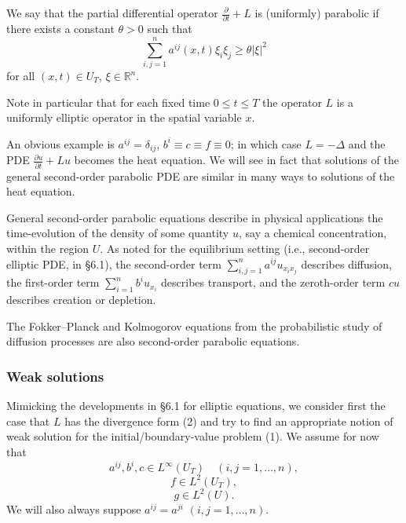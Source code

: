 \begin{definition}
\label{def:uniform-parabolicity}
We say that the partial differential operator $\frac{\partial}{\partial t} + L$ is (uniformly) parabolic if there exists a constant $\theta > 0$ such that
\[
\sum_{i,j=1}^{n} a^{ij}(x,t)\xi_i \xi_j \geq \theta|\xi|^2
\tag{4}
\]
for all $(x,t) \in U_T$, $\xi \in \mathbb{R}^n$.
\end{definition}

\begin{remark}
\label{rem:parabolic-operator-elliptic-fixed-time}
Note in particular that for each fixed time $0 \leq t \leq T$ the operator $L$ is a uniformly elliptic operator in the spatial variable $x$.
\end{remark}

An obvious example is $a^{ij} = \delta_{ij}$, $b^i \equiv c \equiv f \equiv 0$; in which case $L = -\Delta$ and the PDE $\frac{\partial u}{\partial t} + Lu$ becomes the heat equation. We will see in fact that solutions of the general second-order parabolic PDE are similar in many ways to solutions of the heat equation.

General second-order parabolic equations describe in physical applications the time-evolution of the density of some quantity $u$, say a chemical concentration, within the region $U$. As noted for the equilibrium setting (i.e., second-order elliptic PDE, in \S6.1), the second-order term $\sum_{i,j=1}^n a^{ij}u_{x_i x_j}$ describes diffusion, the first-order term $\sum_{i=1}^n b^i u_{x_i}$ describes transport, and the zeroth-order term $cu$ describes creation or depletion.

The Fokker--Planck and Kolmogorov equations from the probabilistic study of diffusion processes are also second-order parabolic equations.

\subsubsection{Weak solutions}

Mimicking the developments in \S6.1 for elliptic equations, we consider first the case that $L$ has the divergence form (2) and try to find an appropriate notion of weak solution for the initial/boundary-value problem (1). We assume for now that
\[
a^{ij}, b^i, c \in L^\infty(U_T) \quad (i,j = 1, \ldots, n),
\tag{5}
\]
\[
f \in L^2(U_T),
\tag{6}
\]
\[
g \in L^2(U).
\tag{7}
\]
We will also always suppose $a^{ij} = a^{ji}$ $(i,j = 1, \ldots, n)$.

